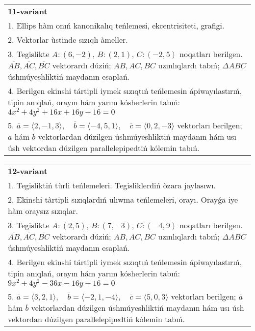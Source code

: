 \documentclass{article}
\begin{document}
\begin{tabular}{m{17cm}}
\textbf{11-variant}\\
1. Ellips hàm onıń kanonikalıq teńlemesi, ekcentrisiteti, grafigi.\\

2. Vektorlar ùstinde sızıqlı àmeller.\\

3. Tegislikte $A: (6, -2)$, $B: (2, 1)$, $C: (-2, 5)$ noqatları berilgen. $\overline{AB}, \overline{AC}, \overline{BC}$ vektorardı dúziń; $AB, AC, BC$ uzınlıqlardı tabıń; $\Delta ABC$ úshmúyeshliktiń maydanın esaplań. \\

4. Berilgen ekinshi tártipli iymek sızıqtıń teńlemesin ápiwayılastırıń, tipin anıqlań, orayın hám yarım kósherlerin tabıń: $4x^2+4y^2+16x+16y+16=0$\\

5. \(\overline{a} = \langle 2, -1, 3 \rangle, \quad \overline{b} = \langle -4, 5, 1 \rangle, \quad \overline{c} = \langle 0, 2, -3 \rangle\) vektorları berilgen; \(\overline{a}\) hám \(\overline{b}\) vektorlardan dúzilgen úshmúyeshliktiń maydanın hám usı úsh vektordan dúzilgen parallelepipedtiń kólemin tabıń.
\end{tabular}
\vspace{1cm}


\begin{tabular}{m{17cm}}
\textbf{12-variant}\\
1. Tegisliktiń tùrli teńlemeleri. Tegisliklerdiń òzara jaylasıwı.\\

2. Ekinshi tàrtipli sızıqlardıń ulıwma teńlemeleri, orayı. Orayǵa iye hàm oraysız sızıqlar.\\

3. Tegislikte $A: (2, 5)$, $B: (7, -3)$, $C: (-4, 9)$ noqatları berilgen. $\overline{AB}, \overline{AC}, \overline{BC}$ vektorardı dúziń; $AB, AC, BC$ uzınlıqlardı tabıń; $\Delta ABC$ úshmúyeshliktiń maydanın esaplań. \\

4. Berilgen ekinshi tártipli iymek sızıqtıń teńlemesin ápiwayılastırıń, tipin anıqlań, orayın hám yarım kósherlerin tabıń: $9x^2+4y^2-36x-16y+16=0$\\

5. \(\overline{a} = \langle 3, 2, 1 \rangle, \quad \overline{b} = \langle -2, 1, -4 \rangle, \quad \overline{c} = \langle 5, 0, 3 \rangle\) vektorları berilgen; \(\overline{a}\) hám \(\overline{b}\) vektorlardan dúzilgen úshmúyeshliktiń maydanın hám usı úsh vektordan dúzilgen parallelepipedtiń kólemin tabıń.
\end{tabular}
\vspace{1cm}
\end{document}
